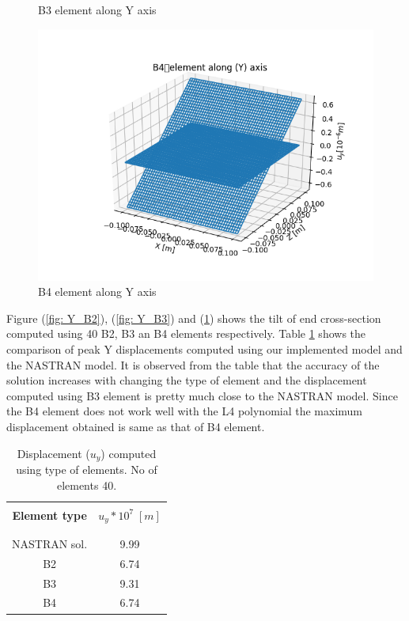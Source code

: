 \documentclass[a4paper,12pt]{article}
\begin{document}
\begin{figure}[!htbp]
\begin{minipage}[b]{0.45\textwidth}
    \caption{B3 element along Y axis}
    \label{fig: Y_B3}
  \end{minipage}
  \hfill
  \begin{minipage}[b]{0.45\textwidth}
    \includegraphics[width=\textwidth]{17.png}
    \caption{B4 element along Y axis}
    \label{fig: Y_B4}
  \end{minipage}
\end{figure}

Figure (\ref{fig: Y_B2}), (\ref{fig: Y_B3}) and (\ref{fig: Y_B4}) shows the tilt of end cross-section computed using 40 B2, B3 an B4 elements respectively. Table \ref{tab:table 8}  shows the comparison of peak Y displacements computed using our implemented model and the NASTRAN model. It is observed from the table that the accuracy of the solution increases with changing the type of element and the displacement computed using B3 element is pretty much close to the NASTRAN model. Since the B4 element does not work well with the L4 polynomial the maximum displacement obtained is same as that of B4 element.
\newpage
\begin{table}[h!]
  \begin{center}
     \begin{tabular}{c c}
      \hline\\
      \textbf{Element type} & \textbf{$u_{y}*10^{7}\;[m]$} \\
      \\
      \hline
      \\[-2pt]
       NASTRAN sol. & 9.99 \\[5pt]
       B2 & 6.74\\[5pt]
       B3 & 9.31 \\[5pt]
       B4 & 6.74 \\[5pt]

      \hline
     \end{tabular}
    \caption{Displacement ($u_{y}$) computed  using type of elements. No of elements 40.}
    \label{tab:table 8}
  \end{center}
\end{table}
\end{document}
